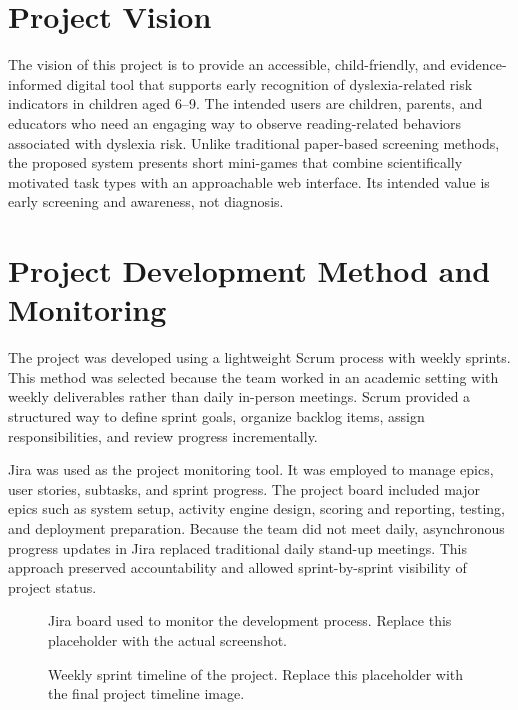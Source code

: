 \documentclass[conference]{IEEEtran}
\begin{document}
\section{Project Vision}

The vision of this project is to provide an accessible, child-friendly, and evidence-informed digital tool that supports early recognition of dyslexia-related risk indicators in children aged 6--9. The intended users are children, parents, and educators who need an engaging way to observe reading-related behaviors associated with dyslexia risk. Unlike traditional paper-based screening methods, the proposed system presents short mini-games that combine scientifically motivated task types with an approachable web interface. Its intended value is early screening and awareness, not diagnosis.

\section{Project Development Method and Monitoring}

The project was developed using a lightweight Scrum process with weekly sprints. This method was selected because the team worked in an academic setting with weekly deliverables rather than daily in-person meetings. Scrum provided a structured way to define sprint goals, organize backlog items, assign responsibilities, and review progress incrementally.

Jira was used as the project monitoring tool. It was employed to manage epics, user stories, subtasks, and sprint progress. The project board included major epics such as system setup, activity engine design, scoring and reporting, testing, and deployment preparation. Because the team did not meet daily, asynchronous progress updates in Jira replaced traditional daily stand-up meetings. This approach preserved accountability and allowed sprint-by-sprint visibility of project status.

\begin{figure}[htbp]
\centering
{}
\caption{Jira board used to monitor the development process. Replace this placeholder with the actual screenshot.}
\label{fig:jira}
\end{figure}

\begin{figure}[htbp]
\centering
{}
\caption{Weekly sprint timeline of the project. Replace this placeholder with the final project timeline image.}
\label{fig:gantt}
\end{figure}
\end{document}
